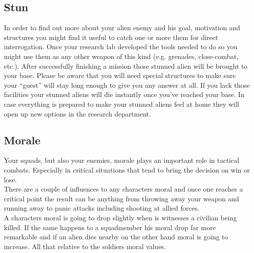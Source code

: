 \subsection{Stun}
In order to find out more about your alien enemy and his goal, motivation and structures you might find it useful to catch one or more them for direct interrogation. Once your research lab developed the tools needed to do so you might use them as any other weapon of this kind (e.g. grenades, close-combat, etc.). After successfully finishing a mission those stunned alien will be brought to your base. Please be aware that you will need special structures to make sure your ``guest'' will stay long enough to give you any answer at all. If you lack those facilities your stunned aliens will die instantly once you've reached your base. In case everything is prepared to make your stunned aliens feel at home they will open up new options in the research department.

\subsection{Morale}
Your squads, but also your enemies, morale plays an important role in tactical combats. Especially in critical situations that tend to bring the decision on win or lose.\\
There are a couple of influences to any characters moral and once one reaches a critical point the result can be anything from throwing away your weapon and running away to panic attacks including shooting at allied forces.\\
A characters moral is going to drop slightly when is witnesses a civilian being killed. If the same happens to a squadmember his moral drop far more remarkable and if an alien dies nearby on the other hand moral is going to increase. All that relative to the soldiers moral values.
